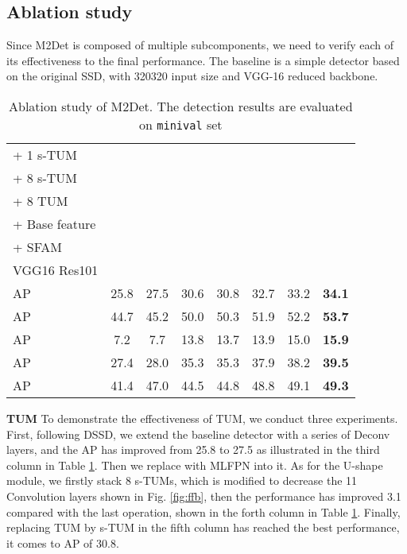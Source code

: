 \documentclass[letterpaper]{article} \usepackage{aaai18}  \usepackage{times}  \usepackage{helvet}  \usepackage{courier}  \usepackage{url}  \usepackage{graphicx}
\begin{document}
\subsection{Ablation study}
Since M2Det is composed of multiple subcomponents, we need to verify each of its effectiveness to the final performance. The baseline is a simple detector based on the original SSD, with 320320 input size and VGG-16 reduced backbone.

\begin{table}[h]
\centering
\scriptsize
\caption{Ablation study of M2Det. The detection results are evaluated on \texttt{minival} set}
\label{tab:SurveyDetails}
\begin{tabular}{l||ccccccc}
\toprule
+ 1 s-TUM & {} && {}  &{} &{}& {}  \\
+ 8 s-TUM & {} &{}& &{} &{}& {}   \\
+ 8 TUM &{}&{} & {} &  & &  &    \\
+ Base feature &{} & {} &  {}&{} &  &  &  \\
+ SFAM & {}& {} &{} & {} & {} &  & \\
VGG16  Res101 & {}&{} &{} &  {} & {} & {} &  \\

\midrule
AP & 25.8& 27.5&30.6 & 30.8 & 32.7 & 33.2  &\textbf{34.1}\\ AP & 44.7& 45.2&50.0 & 50.3 & 51.9 & 52.2 &\textbf{53.7}\\ AP & 7.2& 7.7 &13.8 &13.7 & 13.9 & 15.0 &\textbf{15.9}\\ AP & 27.4& 28.0 &35.3& 35.3 & 37.9 & 38.2 &\textbf{39.5}  \\ AP & 41.4& 47.0 & 44.5&44.8 & 48.8 & 49.1  &\textbf{49.3}\\
\bottomrule
\end{tabular}
\label{tab:Margin_settings}
\end{table}


\textbf{TUM} To demonstrate the effectiveness of TUM, we conduct three experiments. First, following DSSD, we extend the baseline detector with a series of Deconv layers, and the AP has improved from 25.8 to 27.5 as illustrated in the third column in Table \ref{tab:Margin_settings}. Then we replace with MLFPN into it. As for the U-shape module, we firstly stack 8 s-TUMs, which is modified to decrease the 11 Convolution layers shown in Fig. \ref{fig:ffb}, then the performance has improved 3.1 compared with the last operation, shown in the forth column in Table \ref{tab:Margin_settings}. Finally, replacing TUM by s-TUM in the fifth column has reached the best performance, it comes to AP of 30.8.
\end{document}
